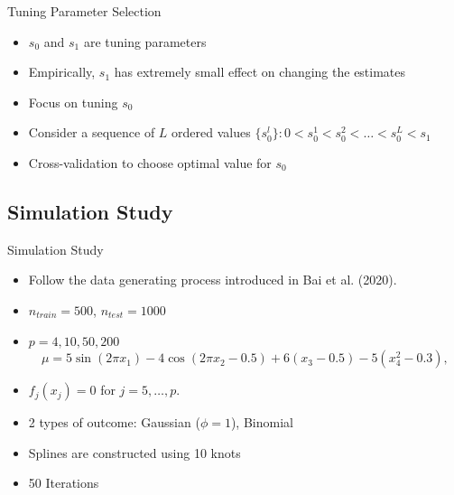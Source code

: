 \documentclass[
  ignorenonframetext,
  aspectratio=169]{beamer}
\providecommand{\tightlist}{%
  \setlength{\itemsep}{0pt}\setlength{\parskip}{0pt}}
\begin{document}
\begin{frame}{Tuning Parameter Selection}
\protect\hypertarget{tuning-parameter-selection}{}
\begin{itemize}
\tightlist
\item
  \(s_0\) and \(s_1\) are tuning parameters
\item
  Empirically, \(s_1\) has extremely small effect on changing the
  estimates
\item
  Focus on tuning \(s_0\)
\item
  Consider a sequence of \(L\) ordered values
  \(\{s_0^l\}: 0 < s_0^1 < s_0^2 < \dots < s_0^L < s_1\)
\item
  Cross-validation to choose optimal value for \(s_0\)
\end{itemize}
\end{frame}

\hypertarget{simulation-study}{%
\subsection{Simulation Study}\label{simulation-study}}

\begin{frame}{Simulation Study}
\begin{itemize}
\item
  Follow the data generating process introduced in Bai et al. (2020).
\item
  \(n_{train} = 500\), \(n_{test}=1000\)
\item
  \(p=4, 10, 50, 200\) \[
  \mu = 5 \sin(2\pi x_1) - 4 \cos(2\pi x_2 -0.5) + 6(x_3-0.5) - 5(x_4^2 -0.3),
  \]
\item
  \(f_j(x_j) = 0\) for \(j = 5, \dots, p\).
\item
  2 types of outcome: Gaussian (\(\phi=1\)), Binomial
\item
  Splines are constructed using 10 knots
\item
  50 Iterations
\end{itemize}
\end{frame}
\end{document}
